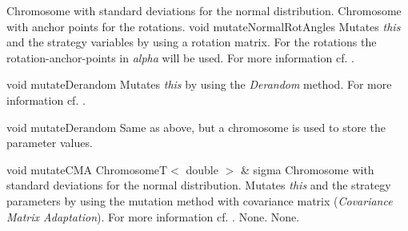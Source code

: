 \clearpage

\setNormalInstance
\setCorrectWidthThree{8pt}
{Chromosome with standard deviations for the normal distribution.}
{Chromosome with anchor points for the rotations.}
\printMethodWithParamsSaved
{void}
{}
{mutateNormalRotAngles}
{Mutates {\em this} and the strategy variables by using a
 rotation matrix. For the rotations the rotation-anchor-points in
 {\em alpha} will be used. For more information cf.
 \cite{GSA}.}
{}
\setCorrectWidthThree{4pt}

\vspace*{4ex}

\setNormalInstance
\setCorrectWidthThree{8pt}
\printMethodWithParamsSaved
{void}
{}
{mutateDerandom}
{Mutates {\em this} by using the {\em Derandom} method. For more
 information cf. \cite{GSA}.}
{}
\setCorrectWidthThree{4pt}

\vspace*{4ex}

\setNormalInstance
\setCorrectWidthThree{8pt}
\printMethodWithParamsSaved
{void}
{}
{mutateDerandom}
{Same as above, but a chromosome is used to store the parameter
 values.}
{}
\setCorrectWidthThree{4pt}

\clearpage

\setNormalInstance
\printMethodWithOneParam
{void}
{mutateCMA}
{ChromosomeT$<$ double $>$ \&}
{sigma}
{Chromosome with standard deviations for the normal distribution.}
{Mutates {\em this} and the strategy parameters by using the mutation
 method with covariance matrix ({\em Covariance Matrix Adaptation}).
 For more information cf. \cite{CMA}.}
{None.}
{None.}

